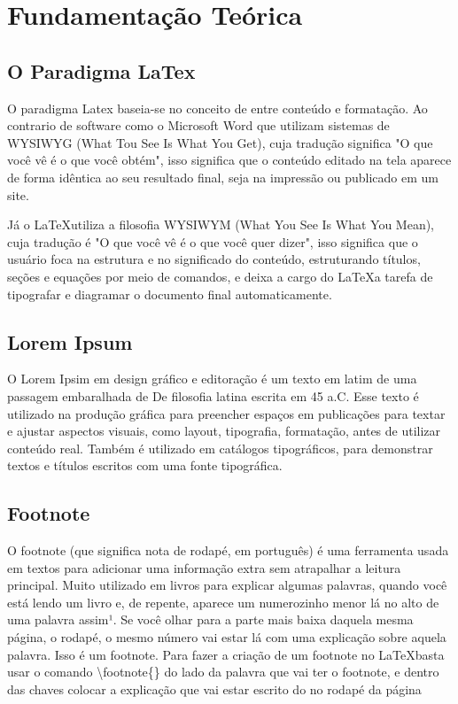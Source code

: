 


\chapter{Fundamentação Teórica}
\lipsum[1-3]

\section{O Paradigma LaTex}
O paradigma Latex baseia-se no conceito de entre conteúdo e formatação. Ao contrario de software como o Microsoft Word que utilizam sistemas de WYSIWYG (What Tou See Is What You Get), cuja tradução significa "O que você vê é o que você obtém", isso significa que o conteúdo editado na tela aparece de forma idêntica ao seu resultado final, seja na impressão ou publicado em um site. 

Já o \LaTeX utiliza a filosofia WYSIWYM (What You See Is What You Mean), cuja tradução é "O que você vê é o que você quer dizer", isso significa que o usuário foca na estrutura e no significado do conteúdo, estruturando títulos, seções e equações por meio de comandos, e deixa a cargo do \LaTeX a tarefa de tipografar e diagramar o documento final automaticamente.


\section{Lorem Ipsum}

O Lorem Ipsim em design gráfico e editoração é um texto em latim de uma passagem embaralhada de De filosofia latina escrita em 45 a.C. Esse texto é utilizado na produção gráfica para preencher espaços em publicações para textar e ajustar aspectos visuais, como layout, tipografia, formatação, antes de utilizar conteúdo real. Também é utilizado em catálogos tipográficos, para demonstrar textos e títulos escritos com uma fonte tipográfica.

\section{Footnote}

O footnote (que significa nota de rodapé, em português) é uma ferramenta usada em textos para adicionar uma informação extra sem atrapalhar a leitura principal. Muito utilizado em livros para explicar algumas palavras, quando você está lendo um livro e, de repente, aparece um numerozinho menor lá no alto de uma palavra assim¹. Se você olhar para a parte mais baixa daquela mesma página, o rodapé, o mesmo número vai estar lá com uma explicação sobre aquela palavra. Isso é um footnote.
Para fazer a criação de um footnote no \LaTeX basta usar o comando \textbackslash footnote\{\} do lado da palavra que vai ter o footnote, e dentro das chaves colocar a explicação que vai estar escrito do no rodapé da página

